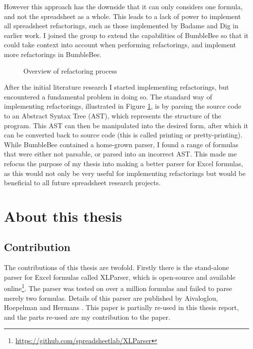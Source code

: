 \documentclass[12pt,a4paper,onecolumn,oneside,parskip]{memoir}
\begin{document}
However this approach has the downside that it can only considers one formula, and not the spreadsheet as a whole.
This leads to a lack of power to implement all spreadsheet refactorings, such as those implemented by Badame and Dig \cite{badame2012refactoring} in earlier work.
I joined the group to extend the capabilities of BumbleBee so that it could take context into account when performing refactorings, and implement more refactorings in BumbleBee.

\begin{figure}
\centerfloat

\caption{Overview of refactoring process}
\label{fig:refactoring-process}
\end{figure}

After the initial literature research I started implementing refactorings, but encountered a fundamental problem in doing so.
The standard way of implementing refactorings, illustrated in Figure \ref{fig:refactoring-process}, is by parsing the source code to an Abstract Syntax Tree (AST), which represents the structure of the program.
This AST can then be manipulated into the desired form, after which it can be converted back to source code (this is called printing or pretty-printing).
While BumbleBee contained a home-grown parser, I found a range of formulas that were either not parsable, or parsed into an incorrect AST.
This made me refocus the purpose of my thesis into making a better parser for Excel formulas, as this would not only be very useful for implementing refactorings but would be beneficial to all future spreadsheet research projects.

\section{About this thesis}

\subsection{Contribution}

The contributions of this thesis are twofold. Firstly there is the stand-alone parser for Excel formulas called XLParser, which is open-source and available online\footnote{\url{https://github.com/spreadsheetlab/XLParser}}. The parser was tested on over a million formulas and failed to parse merely two formulas.
Details of this parser are published by Aivaloglou, Hoepelman and Hermans \cite{xlparser}.
This paper is partially re-used in this thesis report, and the parts re-used are my contribution to the paper.
\end{document}
